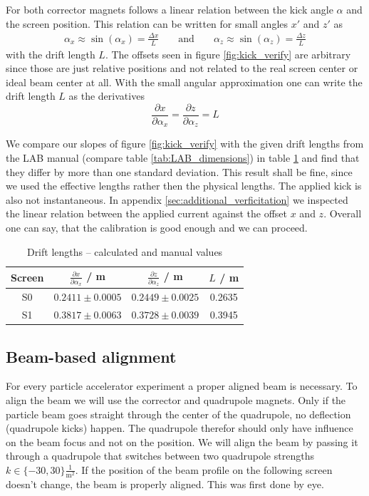 \documentclass[11pt,a4paper,notitlepage]{scrartcl}
\begin{document}
For both corrector magnets follows a linear relation between the kick angle $\alpha$ and the screen position. This relation can be written for small angles $x'$ and $z'$ as 
\begin{align*}
	\alpha_x\approx \sin(\alpha_x)=\frac{\Delta x}{L} && \text{ and } && \alpha_z\approx \sin(\alpha_z)=\frac{\Delta z}{L}
\end{align*}
with the drift length $L$. The offsets seen in figure \ref{fig:kick_verify} are arbitrary since those are just relative positions and not related to the real screen center or ideal beam center at all. 
With the small angular approximation one can write the drift length $L$ as the derivatives
$$\frac{\partial x}{\partial \alpha_x}=\frac{\partial z}{\partial \alpha_z}=L$$

We compare our slopes of figure \ref{fig:kick_verify} with the given drift lengths from the LAB manual \cite{script} (compare table  \ref{tab:LAB_dimensions}) in table \ref{tab:verify} and find that they differ by more than one standard deviation. This result shall be fine, since we used the effective lengths rather then the physical lengths. The applied kick is also not instantaneous.  In appendix \ref{sec:additional_verficitation} we inspected the linear relation between the applied current against the offset $x$ and $z$. Overall one can say, that the calibration is good enough and we can proceed.
\begin{table}
	\centering
	\begin{tabular}{|c|c|c|c|}
		\hline
		Screen &$\frac{\partial x}{\partial \alpha_x}$ / m  &$\frac{\partial z}{\partial \alpha_z}$ / m  & $L$ / m\\
		\hline
		S0 & $0.2411\pm 0.0005$ & $0.2449\pm 0.0025$ & 0.2635 \\
		S1 &$0.3817\pm 0.0063$&$0.3728\pm 0.0039$& 0.3945\\
		\hline
	\end{tabular}
	\caption{Drift lengths -- calculated and manual values \cite{script}}\label{tab:verify}
\end{table}

\subsection{Beam-based alignment}
For every particle accelerator experiment a proper aligned beam is necessary. To align the beam we will use the corrector and quadrupole magnets. Only if the particle beam goes straight through the center of the quadrupole, no deflection (quadrupole kicks) happen. The quadrupole therefor should only have influence on the beam focus and not on the position. We will align the beam by passing it through a quadrupole that switches between two quadrupole strengths $k\in\{-30,30\}\frac{1}{\text{m}^2}$. If the position of the beam profile on the following screen doesn't change, the beam is properly aligned. This was first done by eye. 
\end{document}
